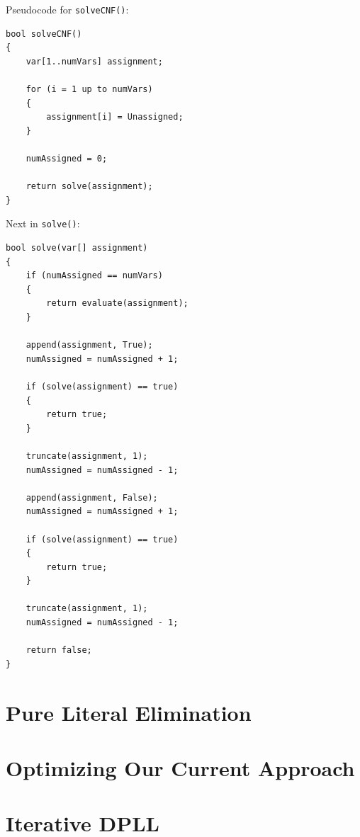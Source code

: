 Pseudocode for \texttt{solveCNF()}:

\begin{lstlisting}
bool solveCNF()
{
    var[1..numVars] assignment;

    for (i = 1 up to numVars)
    {
        assignment[i] = Unassigned;
    }

    numAssigned = 0;

    return solve(assignment);
}
\end{lstlisting}

Next in \texttt{solve()}:

\begin{lstlisting}
bool solve(var[] assignment)
{
    if (numAssigned == numVars)
    {
        return evaluate(assignment);
    }

    append(assignment, True);
    numAssigned = numAssigned + 1;

    if (solve(assignment) == true)
    {
        return true;
    }

    truncate(assignment, 1);
    numAssigned = numAssigned - 1;

    append(assignment, False);
    numAssigned = numAssigned + 1;

    if (solve(assignment) == true)
    {
        return true;
    }

    truncate(assignment, 1);
    numAssigned = numAssigned - 1;

    return false;
}
\end{lstlisting}

\section{Pure Literal Elimination}
\section{Optimizing Our Current Approach}
\section{Iterative DPLL}
